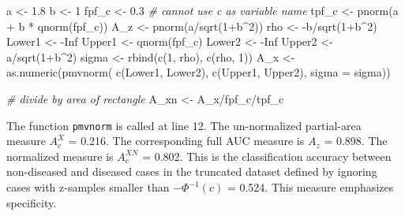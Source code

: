 \documentclass[
]{book}
\newenvironment{Shaded}{\begin{snugshade}}{\end{snugshade}}
\newcommand{\AttributeTok}[1]{\textcolor[rgb]{0.77,0.63,0.00}{#1}}
\newcommand{\CommentTok}[1]{\textcolor[rgb]{0.56,0.35,0.01}{\textit{#1}}}
\newcommand{\ConstantTok}[1]{\textcolor[rgb]{0.00,0.00,0.00}{#1}}
\newcommand{\DecValTok}[1]{\textcolor[rgb]{0.00,0.00,0.81}{#1}}
\newcommand{\FloatTok}[1]{\textcolor[rgb]{0.00,0.00,0.81}{#1}}
\newcommand{\FunctionTok}[1]{\textcolor[rgb]{0.00,0.00,0.00}{#1}}
\newcommand{\NormalTok}[1]{#1}
\newcommand{\OtherTok}[1]{\textcolor[rgb]{0.56,0.35,0.01}{#1}}
\newcommand{\SpecialCharTok}[1]{\textcolor[rgb]{0.00,0.00,0.00}{#1}}
\begin{document}
\begin{Shaded}
\begin{Highlighting}[numbers=left,,]
\NormalTok{a }\OtherTok{\textless{}{-}} \FloatTok{1.8}
\NormalTok{b }\OtherTok{\textless{}{-}} \DecValTok{1}
\NormalTok{fpf\_c }\OtherTok{\textless{}{-}} \FloatTok{0.3} \CommentTok{\# cannot use c as variable name}
\NormalTok{tpf\_c }\OtherTok{\textless{}{-}} \FunctionTok{pnorm}\NormalTok{(a }\SpecialCharTok{+}\NormalTok{ b }\SpecialCharTok{*} \FunctionTok{qnorm}\NormalTok{(fpf\_c))}
\NormalTok{A\_z }\OtherTok{\textless{}{-}} \FunctionTok{pnorm}\NormalTok{(a}\SpecialCharTok{/}\FunctionTok{sqrt}\NormalTok{(}\DecValTok{1}\SpecialCharTok{+}\NormalTok{b}\SpecialCharTok{\^{}}\DecValTok{2}\NormalTok{))}
\NormalTok{rho }\OtherTok{\textless{}{-}} \SpecialCharTok{{-}}\NormalTok{b}\SpecialCharTok{/}\FunctionTok{sqrt}\NormalTok{(}\DecValTok{1}\SpecialCharTok{+}\NormalTok{b}\SpecialCharTok{\^{}}\DecValTok{2}\NormalTok{)}
\NormalTok{Lower1 }\OtherTok{\textless{}{-}} \SpecialCharTok{{-}}\ConstantTok{Inf}
\NormalTok{Upper1 }\OtherTok{\textless{}{-}} \FunctionTok{qnorm}\NormalTok{(fpf\_c)}
\NormalTok{Lower2 }\OtherTok{\textless{}{-}} \SpecialCharTok{{-}}\ConstantTok{Inf}
\NormalTok{Upper2 }\OtherTok{\textless{}{-}}\NormalTok{ a}\SpecialCharTok{/}\FunctionTok{sqrt}\NormalTok{(}\DecValTok{1}\SpecialCharTok{+}\NormalTok{b}\SpecialCharTok{\^{}}\DecValTok{2}\NormalTok{)}
\NormalTok{sigma }\OtherTok{\textless{}{-}} \FunctionTok{rbind}\NormalTok{(}\FunctionTok{c}\NormalTok{(}\DecValTok{1}\NormalTok{, rho), }\FunctionTok{c}\NormalTok{(rho, }\DecValTok{1}\NormalTok{))}
\NormalTok{A\_x }\OtherTok{\textless{}{-}} \FunctionTok{as.numeric}\NormalTok{(}\FunctionTok{pmvnorm}\NormalTok{(}
  \FunctionTok{c}\NormalTok{(Lower1, Lower2), }
  \FunctionTok{c}\NormalTok{(Upper1, Upper2), }
  \AttributeTok{sigma =}\NormalTok{ sigma))}

\CommentTok{\# divide by area of rectangle}
\NormalTok{A\_xn }\OtherTok{\textless{}{-}}\NormalTok{ A\_x}\SpecialCharTok{/}\NormalTok{fpf\_c}\SpecialCharTok{/}\NormalTok{tpf\_c}
\end{Highlighting}
\end{Shaded}

The function \texttt{pmvnorm} is called at line 12. The un-normalized partial-area measure \(A_c^{X}\) = 0.216. The corresponding full AUC measure is \(A_z\) = 0.898. The normalized measure is \(A_c^{XN}\) = 0.802. This is the classification accuracy between non-diseased and diseased cases in the truncated dataset defined by ignoring cases with z-samples smaller than \(-\Phi^{-1}(c)\) = 0.524. This measure emphasizes specificity.
\end{document}
